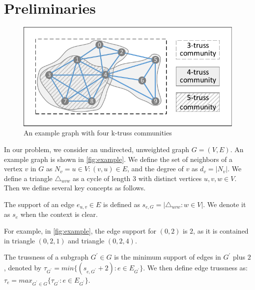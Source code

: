 \section{Preliminaries}
\label{preliminary}

\begin{figure}[ht]
    \centering
    \includegraphics[width=0.7\linewidth, trim={0.1cm 0.1cm, 0.1cm, 0.1cm}, clip]{./figures/k-truss.pdf}
    \caption{An example graph with four k-truss communities}
    \label{fig:example}
\end{figure}

In our problem, we consider an undirected, unweighted graph $G = (V,E)$. An example graph is shown in \autoref{fig:example}.
We define the set of neighbors of a vertex $v$ in $G$ as $N_v = {u \in V :(v, u) \in E}$, and the degree of $v$ as $d_v = |N_v|$. We define a triangle $\triangle_{uvw}$ as a cycle of length $3$ with distinct vertices $u, v, w \in V$. 
Then we define several key concepts as follows.

\begin{Def}
The support of an edge $e_{u,v} \in E$ is defined as $s_{e,G} = |{\triangle_{uvw} : w \in V}|$. 
We denote it as $s_e$ when the context is clear.
\label{def:edge_support}
\end{Def}

For example, in \autoref{fig:example}, the edge support for $(0,2)$ is $2$, as it is contained in triangle $(0,2,1)$ and triangle $(0,2,4)$.

\begin{Def}[Trussness] 
The trussness of a subgraph $G^{\prime} \in G$ is the minimum support of edges in $G^{\prime}$ plus $2$, denoted by $\tau_{G^{\prime}} = min\{(s_{e,G^{\prime}} + 2): e \in E_{G^{\prime}}\} $.  We then define edge trussness as: $\tau_{e} = max_{G^{\prime} \in G}\{\tau_{G^{\prime}}: e \in E_{G^{\prime}}\}$.
\label{def:trussness}
\end{Def}

